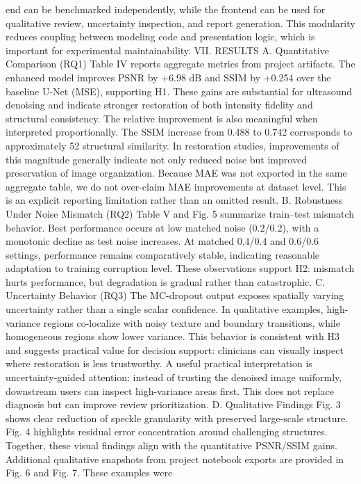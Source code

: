 end can be benchmarked independently, while the frontend
can be used for qualitative review, uncertainty inspection, and
report generation. This modularity reduces coupling between
modeling code and presentation logic, which is important for
experimental maintainability.
VII. RESULTS
A. Quantitative Comparison (RQ1)
Table IV reports aggregate metrics from project artifacts.
The enhanced model improves PSNR by +6.98 dB and SSIM
by +0.254 over the baseline U-Net (MSE), supporting H1.
These gains are substantial for ultrasound denoising and indicate stronger restoration of both intensity fidelity and structural
consistency.
The relative improvement is also meaningful when interpreted proportionally. The SSIM increase from 0.488 to 0.742
corresponds to approximately 52%
structural similarity. In restoration studies, improvements of
this magnitude generally indicate not only reduced noise but
improved preservation of image organization.
Because MAE was not exported in the same aggregate table,
we do not over-claim MAE improvements at dataset level. This
is an explicit reporting limitation rather than an omitted result.
B. Robustness Under Noise Mismatch (RQ2)
Table V and Fig. 5 summarize train–test mismatch behavior.
Best performance occurs at low matched noise (0.2/0.2), with
a monotonic decline as test noise increases. At matched 0.4/0.4
and 0.6/0.6 settings, performance remains comparatively stable, indicating reasonable adaptation to training corruption
level. These observations support H2: mismatch hurts performance, but degradation is gradual rather than catastrophic.
C. Uncertainty Behavior (RQ3)
The MC-dropout output exposes spatially varying uncertainty rather than a single scalar confidence. In qualitative
examples, high-variance regions co-localize with noisy texture
and boundary transitions, while homogeneous regions show
lower variance. This behavior is consistent with H3 and
suggests practical value for decision support: clinicians can
visually inspect where restoration is less trustworthy.
A useful practical interpretation is uncertainty-guided attention: instead of trusting the denoised image uniformly, downstream users can inspect high-variance areas first. This does
not replace diagnosis but can improve review prioritization.
D. Qualitative Findings
Fig. 3 shows clear reduction of speckle granularity with
preserved large-scale structure. Fig. 4 highlights residual error
concentration around challenging structures. Together, these
visual findings align with the quantitative PSNR/SSIM gains.
Additional qualitative snapshots from project notebook exports are provided in Fig. 6 and Fig. 7. These examples were
